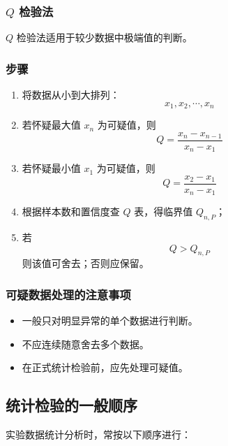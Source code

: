 \documentclass[12pt,a4paper]{article}
\numberwithin{equation}{section}
\begin{document}
\subsubsection{$Q$ 检验法}

$Q$ 检验法适用于较少数据中极端值的判断。

\subsubsection*{步骤}

\begin{enumerate}
    \item 将数据从小到大排列：
\begin{equation}
    x_1,x_2,\cdots,x_n
\end{equation}
    \item 若怀疑最大值 $x_n$ 为可疑值，则
\begin{equation}
    Q=\frac{x_n-x_{n-1}}{x_n-x_1}
\end{equation}
    \item 若怀疑最小值 $x_1$ 为可疑值，则
\begin{equation}
    Q=\frac{x_2-x_1}{x_n-x_1}
\end{equation}
    \item 根据样本数和置信度查 $Q$ 表，得临界值 $Q_{n,P}$；
    \item 若
\begin{equation}
    Q>Q_{n,P}
\end{equation}
    则该值可舍去；否则应保留。
\end{enumerate}

\subsubsection{可疑数据处理的注意事项}

\begin{itemize}
    \item 一般只对明显异常的单个数据进行判断。
    \item 不应连续随意舍去多个数据。
    \item 在正式统计检验前，应先处理可疑值。
\end{itemize}

\subsection{统计检验的一般顺序}

实验数据统计分析时，常按以下顺序进行：
\end{document}
